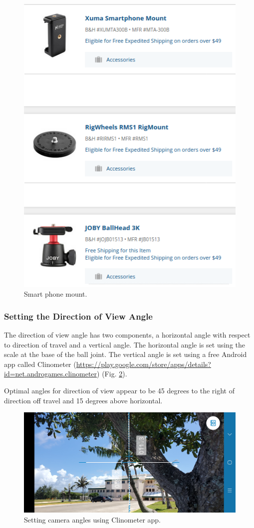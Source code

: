 \documentclass[12pt,letterpaper,english,bibliography=totocnumbered, abstract=on]{scrartcl}
\begin{document}
\begin{figure}[h]
	\centering
	\includegraphics[width=0.7\linewidth]{images/mount}
	\caption{Smart phone mount.}
	\label{fig:mount}
\end{figure}

\subsubsection{Setting the Direction of View Angle}

The direction of view angle has two components, a horizontal angle with respect to direction of travel and a vertical angle. The horizontal angle is set using the scale at the base of the ball joint. The vertical angle is set using a free Android app called Clinometer (\url{https://play.google.com/store/apps/details?id=net.androgames.clinometer}) (Fig. \ref{fig:clinometer}).  

Optimal angles for direction of view appear to be 45 degrees to the right of direction off travel and 15 degrees above horizontal.

\begin{figure}[h]
	\centering
	\includegraphics[width=0.7\linewidth]{images/clinometer}
	\caption{Setting camera angles using Clinometer app.}
	\label{fig:clinometer}
\end{figure}
\end{document}
